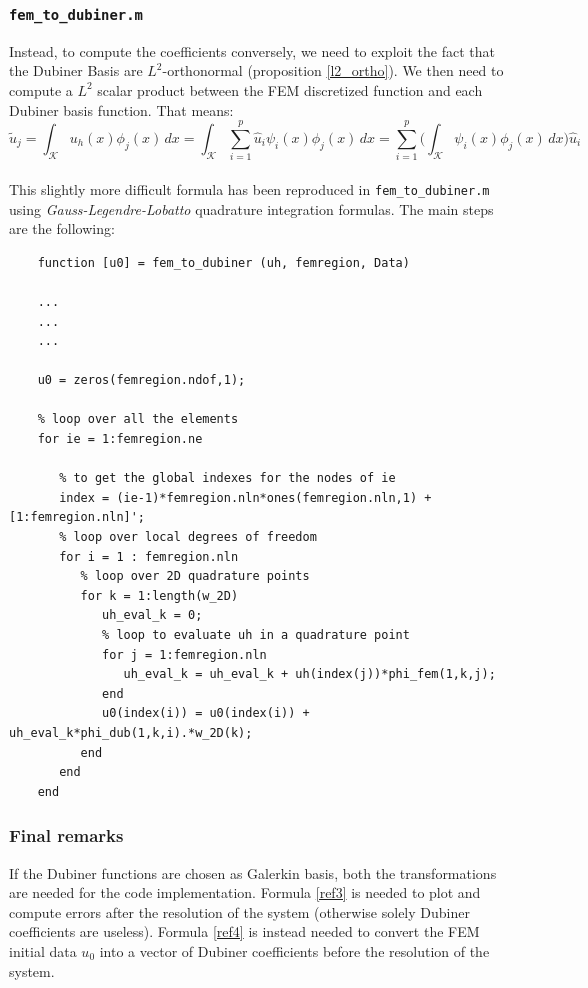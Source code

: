 \documentclass[a4paper,11pt]{article}
\begin{document}
	\subsubsection{\texttt{fem\_to\_dubiner.m}}
	\noindent Instead, to compute the coefficients conversely, we need to exploit the fact that the Dubiner Basis are $L^2$-orthonormal (proposition \ref{l2_ortho}). We then need to compute a $L^2$ scalar product between the FEM discretized function and each Dubiner basis function. That means:
	\begin{equation}\label{ref4}
	\tilde{u}_j = \int_\mathcal{K} u_h(x) \phi_j(x) \,dx = \int_{\mathcal{K}} \sum_{i=1}^p \hat{u}_i\psi_i(x) \phi_j(x) \,dx = \sum_{i=1}^p \Big(\int_{\mathcal{K}}\psi_i(x)\phi_j(x)\,dx \Big) \hat{u}_i
	\end{equation}
	\vspace{2mm} \\
	\noindent This slightly more difficult formula has been reproduced in \texttt{fem\_to\_dubiner.m} using \emph{Gauss-Legendre-Lobatto} quadrature integration formulas. The main steps are the following:
	\begin{verbatim}
	function [u0] = fem_to_dubiner (uh, femregion, Data)
	
	...
	...
	...
	
	u0 = zeros(femregion.ndof,1);
	
	% loop over all the elements
	for ie = 1:femregion.ne
	
	   % to get the global indexes for the nodes of ie 
	   index = (ie-1)*femregion.nln*ones(femregion.nln,1) + [1:femregion.nln]';
	   % loop over local degrees of freedom
	   for i = 1 : femregion.nln
	      % loop over 2D quadrature points
	      for k = 1:length(w_2D) 
	         uh_eval_k = 0;
	         % loop to evaluate uh in a quadrature point
	         for j = 1:femregion.nln
	            uh_eval_k = uh_eval_k + uh(index(j))*phi_fem(1,k,j);
	         end
	         u0(index(i)) = u0(index(i)) + uh_eval_k*phi_dub(1,k,i).*w_2D(k);
	      end
	   end    
	end
	\end{verbatim}
	
	\vspace{5mm}
	\subsubsection{Final remarks} 
	\noindent If the Dubiner functions are chosen as Galerkin basis, both the transformations are needed for the code implementation. Formula \ref{ref3} is needed to plot and compute errors after the resolution of the system (otherwise solely Dubiner coefficients are useless). Formula \ref{ref4} is instead needed to convert the FEM initial data $u_0$ into a vector of Dubiner coefficients before the resolution of the system.\\
	
\end{document}
